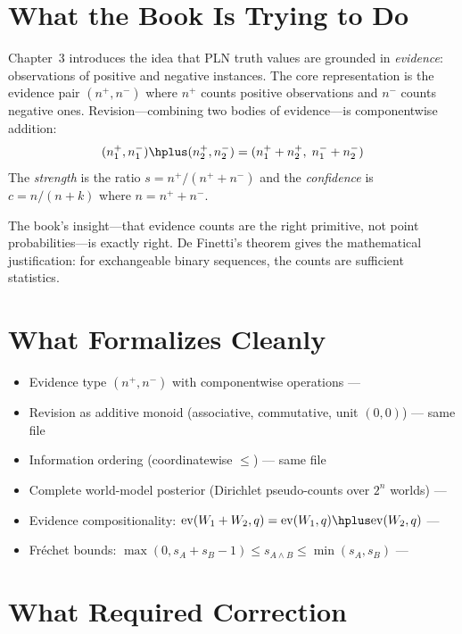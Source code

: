 \documentclass[11pt,openany]{report}
\begin{document}
\section{What the Book Is Trying to Do}

Chapter~3 introduces the idea that PLN truth values are grounded in
\emph{evidence}: observations of positive and negative instances.
The core representation is the evidence pair $(n^+, n^-)$ where
$n^+$ counts positive observations and $n^-$ counts negative ones.
Revision---combining two bodies of evidence---is componentwise addition:
\[
  (n_1^+, n_1^-) \hplus (n_2^+, n_2^-) = (n_1^+ + n_2^+,\; n_1^- + n_2^-)
\]
The \emph{strength} is the ratio $s = n^+ / (n^+ + n^-)$ and the
\emph{confidence} is $c = n / (n + k)$ where $n = n^+ + n^-$.

The book's insight---that evidence counts are the right primitive, not
point probabilities---is exactly right.  De Finetti's theorem gives the
mathematical justification: for exchangeable binary sequences, the counts
are sufficient statistics.

\section{What Formalizes Cleanly}

\begin{itemize}
\item Evidence type $(n^+, n^-)$ with componentwise operations ---
\item Revision as additive monoid (associative, commutative, unit $(0,0)$) ---
  same file
\item Information ordering (coordinatewise $\le$) --- same file
\item Complete world-model posterior (Dirichlet pseudo-counts over $2^n$ worlds) ---
\item Evidence compositionality:
  $\mathrm{ev}(W_1 + W_2, q) = \mathrm{ev}(W_1, q) \hplus \mathrm{ev}(W_2, q)$ ---
\item Fr\'{e}chet bounds: $\max(0, s_A + s_B - 1) \le s_{A \wedge B} \le \min(s_A, s_B)$ ---
\end{itemize}

\section{What Required Correction}
\end{document}
